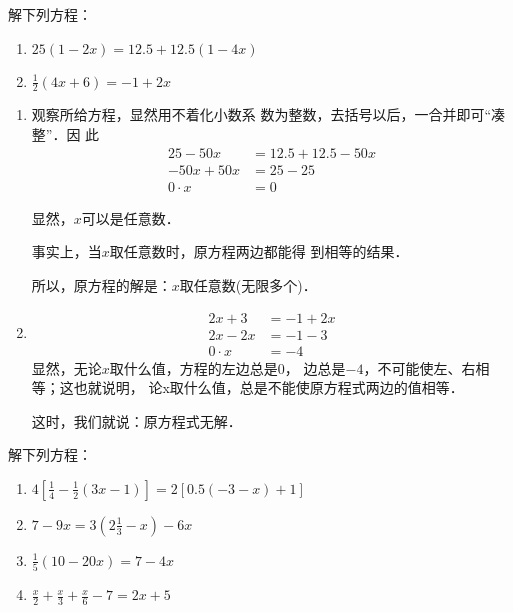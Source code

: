 \begin{example}
解下列方程：
\begin{enumerate}
    \item $25(1-2x)=12.5+12.5(1-4x)$
    \item $\frac{1}{2}(4x+6)=-1+2x$
\end{enumerate}
\end{example}

\begin{solution}
\begin{enumerate}
    \item     观察所给方程，显然用不着化小数系
    数为整数，去括号以后，一合并即可“凑整”．因
    此
    \begin{align*}
25-50x&=12.5+12.5-50x  \tag{去括号}\\
    -50x+50x&=25-25  \tag{移项}\\
    0\cdot x&=0 \tag{合并同类项}    
    \end{align*}
    
    显然，$x$可以是任意数．

    事实上，当$x$取任意数时，原方程两边都能得
到相等的结果．

    所以，原方程的解是：$x$取任意数(无限多个)．
    
\item     \begin{align*}
    2x+3&=-1+2x  \tag{去括号}\\
        2x-2x&=-1-3  \tag{移项}\\
        0\cdot x&=-4 \tag{合并同类项}    
        \end{align*}
        显然，无论$x$取什么值，方程的左边总是0，
    边总是$-4$，不可能使左、右相等；这也就说明，
    论x取什么值，总是不能使原方程式两边的值相等．

        这时，我们就说：原方程式无解．
\end{enumerate}    
\end{solution}

\begin{ex}
解下列方程：
\begin{enumerate}
    \item $4\left[\frac{1}{4}-\frac{1}{2}(3x-1)\right]=2[0.5(-3-x)+1]$
    \item $7-9x=3\left(2\frac{1}{3}-x\right)-6x$
    \item $\frac{1}{5}(10-20x)=7-4x$
    \item $\frac{x}{2}+\frac{x}{3}+\frac{x}{6}-7=2x+5$
\end{enumerate}
\end{ex}


